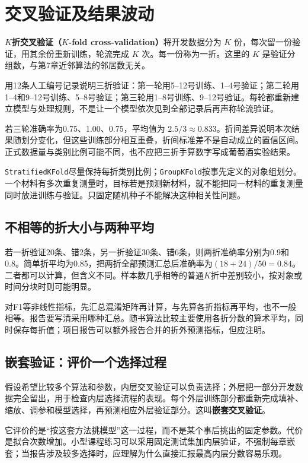 \section{交叉验证及结果波动}
\textbf{$K$折交叉验证（$K$-fold cross-validation）}将开发数据分为 $K$ 份，每次留一份验证，用其余份重新训练，轮流完成 $K$ 次。每一份称为一折。这里的 $K$ 是验证分组数，与第7章近邻算法的邻居数无关。

用12条人工编号记录说明三折验证：第一轮用5--12号训练、1--4号验证；第二轮用1--4和9--12号训练、5--8号验证；第三轮用1--8号训练、9--12号验证。每轮都重新建立模型与处理规则，不是让一个模型依次见到全部记录后再声称轮流验证。

若三轮准确率为0.75、1.00、0.75，平均值为 $2.5/3\approx0.833$。折间差异说明本次结果随划分变化，但这些训练部分相互重叠，折间标准差不是自动成立的置信区间。正式数据量与类别比例可能不同，也不应把三折手算数字写成葡萄酒实验结果。

\texttt{StratifiedKFold}尽量保持每折类别比例；\texttt{GroupKFold}按事先定义的对象组划分。一个材料有多次重复测量时，目标若是预测新材料，就不能把同一材料的重复测量同时放进训练与验证。只固定随机种子不能解决这种相关性问题。

\subsection{不相等的折大小与两种平均}
若一折验证20条、错2条，另一折验证30条、错6条，则两折准确率分别为0.9和0.8。简单折平均为0.85，把两折全部预测汇总后准确率为$(18+24)/50=0.84$。二者都可以计算，但含义不同。样本数几乎相等的普通$K$折中差别较小，按对象或时间分块时则可能明显。

对F1等非线性指标，先汇总混淆矩阵再计算，与先算各折指标再平均，也不一般相等。报告要写清采用哪种汇总。随书算法比较主要使用各折分数的算术平均，同时保存每折值；项目报告可以额外报告合并的折外预测指标，但应注明。

\subsection{嵌套验证：评价一个选择过程}
假设希望比较多个算法和参数，内层交叉验证可以负责选择；外层把一部分开发数据完全留出，用于检查内层选择流程的表现。每个外层训练部分都重新完成填补、缩放、调参和模型选择，再预测相应外层验证部分。这叫\textbf{嵌套交叉验证}。

它评价的是“按这套方法挑模型”这一过程，而不是某个事后挑出的固定参数。代价是拟合次数增加。小型课程练习可以采用固定测试集加内层验证，不强制每章嵌套；当报告涉及较多选择时，应理解为什么直接汇报最高内层分数容易乐观。

